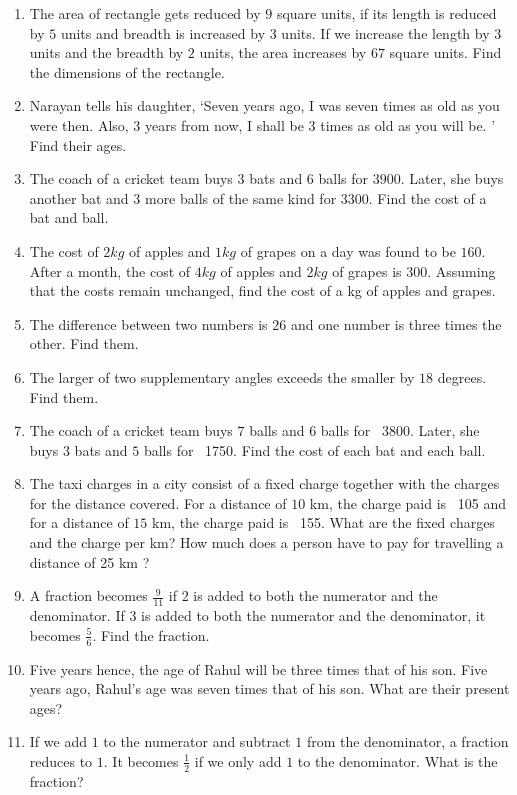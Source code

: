 \begin{enumerate}[label=\thesubsection.\arabic*, ref=\thesubsection.\theenumi]
\item The area of rectangle gets reduced by $9$ square units,  if its length is reduced by $5$ units and breadth is increased by $3$ units.  If we increase the length by $3$ units and the breadth by $2$ units,  the area increases by $67$ square units.  Find the dimensions of the rectangle. 
\item Narayan tells his daughter,  `Seven years ago,  I was seven times as old as you were then.  Also,  $3$ years from now,  I shall be $3$ times as old as  you will be. ' Find their ages.  
\item The coach of a cricket team buys $3$ bats and $6$ balls for  \rupee $ 3900$.  Later,  she buys another bat and $3$ more balls of the same kind for  \rupee $ 3300$.  Find the cost of a bat and ball. 
\item The cost of $2kg$ of apples and $1kg$ of grapes on a day was found to be  \rupee $ 160$.  After a month,  the cost of $4kg$ of apples and $2kg$ of grapes is  \rupee $ 300$.  Assuming that the costs remain unchanged,  find the cost of a kg of apples and grapes.  
    \item The difference between two numbers is $26$ and one number is three times the other.  Find them. 
    \item The larger of two supplementary angles exceeds the smaller by $18$ degrees.  Find them. 
    \item The coach of a cricket team buys $7$ balls and $6$ balls for \rupee~3800.  Later,  she buys $3$ bats and $5$ balls for \rupee~1750.  Find the cost of each bat and each ball. 
    \item The taxi charges in a city consist of a fixed charge together with the charges for the distance covered.  For a distance of $10$ km,  the charge paid is \rupee~105 and for a distance of $15$ km,  the charge paid is \rupee~155.  What are the fixed charges and the charge per km? How much does a person have to pay for travelling a distance of 25 km ? 
    \item A fraction becomes $\frac{9}{11}$ if $2$ is added to both the numerator and the denominator.  If $3$ is added to both the numerator and the denominator,  it becomes $\frac{5}{6}$.  Find the fraction. 
    \item Five years hence,  the age of Rahul will be three times that of his son.  Five years ago,  Rahul's age was seven times that of his son.  What are their present ages?
\item If we add $1$ to the numerator and subtract $1$ from the denominator,  a fraction reduces to $1$.  It becomes $\frac{1}{2}$ if we only add $1$ to the denominator.  What is the fraction?

\end{enumerate}

